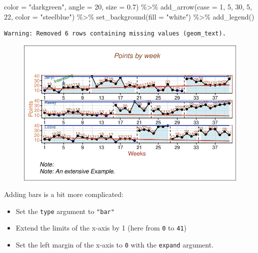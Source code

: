\documentclass[
  letterpaper,
  DIV=11,
  numbers=noendperiod]{scrreprt}
\newenvironment{Shaded}{\begin{snugshade}}{\end{snugshade}}
\newcommand{\AttributeTok}[1]{\textcolor[rgb]{0.40,0.45,0.13}{#1}}
\newcommand{\DecValTok}[1]{\textcolor[rgb]{0.68,0.00,0.00}{#1}}
\newcommand{\FloatTok}[1]{\textcolor[rgb]{0.68,0.00,0.00}{#1}}
\newcommand{\FunctionTok}[1]{\textcolor[rgb]{0.28,0.35,0.67}{#1}}
\newcommand{\NormalTok}[1]{\textcolor[rgb]{0.00,0.23,0.31}{#1}}
\newcommand{\SpecialCharTok}[1]{\textcolor[rgb]{0.37,0.37,0.37}{#1}}
\newcommand{\StringTok}[1]{\textcolor[rgb]{0.13,0.47,0.30}{#1}}
\providecommand{\tightlist}{%
  \setlength{\itemsep}{0pt}\setlength{\parskip}{0pt}}\usepackage{longtable,booktabs,array}
\begin{document}
\begin{Shaded}
\begin{Highlighting}[]
           \AttributeTok{color =} \StringTok{"darkgreen"}\NormalTok{, }\AttributeTok{angle =} \DecValTok{20}\NormalTok{, }\AttributeTok{size =} \FloatTok{0.7}\NormalTok{) }\SpecialCharTok{\%\textgreater{}\%}
  \FunctionTok{add\_arrow}\NormalTok{(}\AttributeTok{case =} \DecValTok{1}\NormalTok{, }\DecValTok{5}\NormalTok{, }\DecValTok{30}\NormalTok{, }\DecValTok{5}\NormalTok{, }\DecValTok{22}\NormalTok{, }\AttributeTok{color =} \StringTok{"steelblue"}\NormalTok{) }\SpecialCharTok{\%\textgreater{}\%}
  \FunctionTok{set\_background}\NormalTok{(}\AttributeTok{fill =} \StringTok{"white"}\NormalTok{) }\SpecialCharTok{\%\textgreater{}\%}
  \FunctionTok{add\_legend}\NormalTok{()}
\end{Highlighting}
\end{Shaded}

\begin{verbatim}
Warning: Removed 6 rows containing missing values (geom_text).
\end{verbatim}

\begin{figure}[H]

{\centering \includegraphics{./ch_scplot_files/figure-pdf/complex3-1.pdf}

}

\end{figure}

Adding bars is a bit more complicated:

\begin{itemize}
\tightlist
\item
  Set the \texttt{type} argument to \texttt{"bar"}\\
\item
  Extend the limits of the x-axis by 1 (here from \texttt{0} to
  \texttt{41})\\
\item
  Set the left margin of the x-axis to \texttt{0} with the
  \texttt{expand} argument.
\end{itemize}
\end{document}
